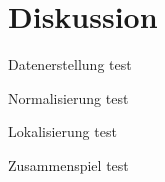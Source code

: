 \section{Diskussion}

\begin{frame}{Datenerstellung}
    test
\end{frame}

\begin{frame}{Normalisierung}
    test
\end{frame}

\begin{frame}{Lokalisierung}
    test
\end{frame}

\begin{frame}{Zusammenspiel}
    test
\end{frame}
